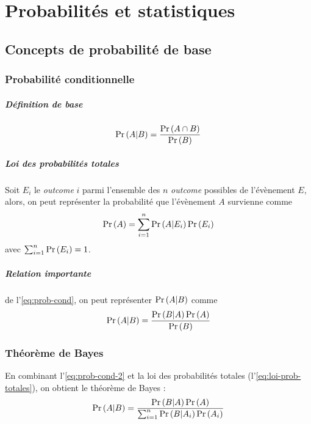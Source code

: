 \chapter{Probabilités et statistiques}

\section{Concepts de probabilité de base}

\subsection{Probabilité conditionnelle}
\paragraph{Définition de base}
\begin{equation}
\label{eq:prob-cond}
\Pr \left( A|B \right) = \frac{\Pr \left( A \cap B \right)}{\Pr \left( B \right)}
\end{equation}

\paragraph{Loi des probabilités totales} Soit $E_i$ le \textit{outcome} $i$ parmi l'ensemble des $n$ \textit{outcome} possibles de l'évènement $E$, alors, on peut représenter la probabilité que l'évènement $A$ survienne comme
\begin{equation}
\label{eq:loi-prob-totales}
\Pr \left( A \right) = \sum_{i=1}^{n} \Pr \left( A | E_i \right) \Pr \left( E_i \right)
\end{equation}
avec $\sum_{i=1}^{n} \Pr \left( E_i \right) = 1$.

\paragraph{Relation importante} de l'\autoref{eq:prob-cond}, on peut représenter $\Pr \left( A|B \right)$ comme
\begin{equation}
\label{eq:prob-cond-2}
\Pr \left( A|B \right) = \frac{\Pr \left( B|A \right) \Pr \left( A \right)}{\Pr \left( B \right)}
\end{equation}

\subsection{Théorème de Bayes} En combinant l'\autoref{eq:prob-cond-2} et la loi des probabilités totales (l'\autoref{eq:loi-prob-totales}), on obtient le théorème de Bayes : 
\begin{equation}
\Pr \left( A|B \right) = \frac{\Pr \left( B|A \right) \Pr \left( A \right)}{\sum_{i=1}^{n} \Pr \left( B | A_i \right) \Pr \left( A_i \right)}
\end{equation}


